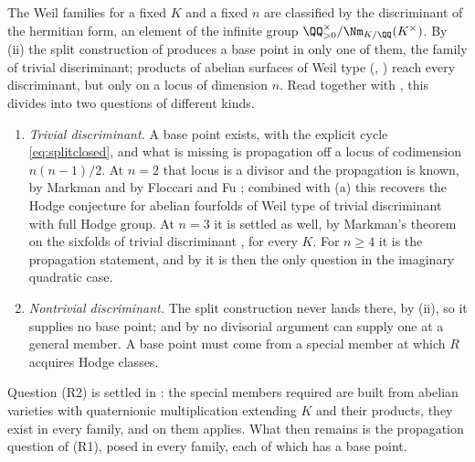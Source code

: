 \begin{remark}\label{rem:residualmap}
The Weil families for a fixed $K$ and a fixed $n$ are classified by the
discriminant of the hermitian form, an element of the infinite group
$\QQ^{\times}_{>0}/\Nm_{K/\QQ}(K^{\times})$. By (ii) the
split construction of  produces a base point in only one of
them, the family of trivial discriminant; products of abelian surfaces of
Weil type (, ) reach every discriminant,
but only on a locus of dimension $n$. Read together with
, this divides  into two questions of
different kinds.
\begin{enumerate}[label=\textup{(R\arabic*)},leftmargin=2.8em,itemsep=2pt]
\item \emph{Trivial discriminant.} A base point exists, with the explicit
  cycle \eqref{eq:splitclosed}, and what is missing is propagation off a locus
  of codimension $n(n-1)/2$. At $n=2$ that locus is a divisor and the
  propagation is known, by Markman \cite{Mar25a,Mar25b} and by Floccari and Fu
  \cite{FF26}; combined with (a) this recovers the Hodge
  conjecture for abelian fourfolds of Weil type of trivial discriminant with
  full Hodge group. At $n=3$ it is settled as well, by Markman's theorem on
  the sixfolds of trivial discriminant \cite{Mar25a,Mar25b}, for every $K$.
  For $n\ge4$ it is the propagation statement, and by \cite[Proposition~2.13]{paperIII}
  it is then the only question in the imaginary quadratic case.
\item \emph{Nontrivial discriminant.} The split construction never lands
  there, by (ii), so it supplies no base
  point; and by  no divisorial argument can supply one at
  a general member. A base point must come from a special member at which $R$
  acquires Hodge classes.
\end{enumerate}
Question (R2) is settled in : the special members
required are built from abelian varieties with quaternionic multiplication
extending $K$ and their products, they exist in every family, and on them
 applies. What then remains is the propagation
question of (R1), posed in every family, each of which has a base point.
\end{remark}

